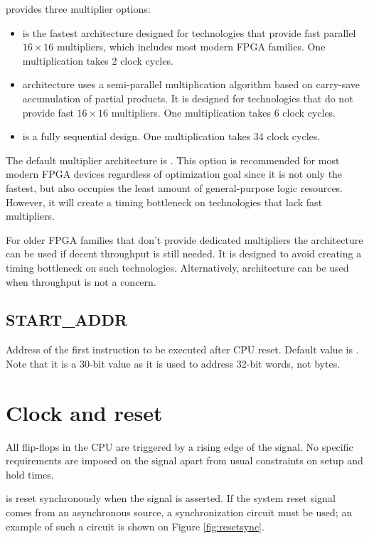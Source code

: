 \documentclass[a4paper,12pt,twoside,extrafontsizes]{memoir}
\begin{document}
\lxp{} provides three multiplier options:

\begin{itemize}
	\item {} is the fastest architecture designed for technologies that provide fast parallel $16 \times 16$ multipliers, which includes most modern FPGA families. One multiplication takes 2 clock cycles.
	\item {} architecture uses a semi-parallel multiplication algorithm based on carry-save accumulation of partial products. It is designed for technologies that do not provide fast $16 \times 16$ multipliers. One multiplication takes 6 clock cycles.
	\item {} is a fully sequential design. One multiplication takes 34 clock cycles.
\end{itemize}

The default multiplier architecture is . This option is recommended for most modern FPGA devices regardless of optimization goal since it is not only the fastest, but also occupies the least amount of general-purpose logic resources. However, it will create a timing bottleneck on technologies that lack fast multipliers.

For older FPGA families that don't provide dedicated multipliers the  architecture can be used if decent throughput is still needed. It is designed to avoid creating a timing bottleneck on such technologies. Alternatively,  architecture can be used when throughput is not a concern.

\subsection{START\_ADDR}

Address of the first instruction to be executed after CPU reset. Default value is . Note that it is a 30-bit value as it is used to address 32-bit words, not bytes.

\section{Clock and reset}
\label{sec:clockreset}

All flip-flops in the CPU are triggered by a rising edge of the  signal. No specific requirements are imposed on the  signal apart from usual constraints on setup and hold times.

\lxp{} is reset synchronously when the  signal is asserted. If the system reset signal comes from an asynchronous source, a synchronization circuit must be used; an example of such a circuit is shown on Figure \ref{fig:resetsync}.
\end{document}
